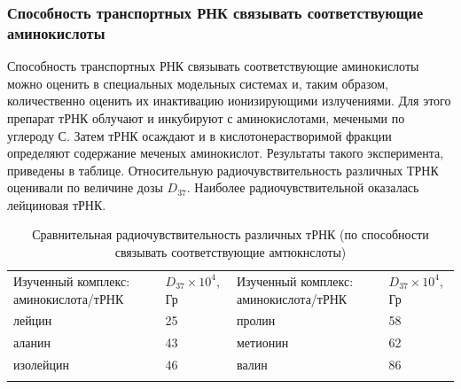 \documentclass[a4paper, 14pt]{article}
\begin{document}
\subsubsection{Способность транспортных РНК связывать соответствующие
аминокислоты}
Способность транспортных РНК связывать соответствующие аминокислоты
можно оценить в специальных модельных системах и, таким образом, количественно
оценить их инактивацию ионизирующими излучениями. Для этого препарат тРНК
облучают и инкубируют с аминокислотами, мечеными по углероду С. Затем тРНК
осаждают и в кислотонерастворимой фракции определяют содержание меченых
аминокислот. Результаты такого эксперимента, приведены в таблице. Относительную
радиочувствительность различных ТРНК оценивали по величине дозы $D_{37}$. Наиболее
радиочувствительной оказалась лейциновая тРНК.
\begin{table}[htbp]
    \centering\begin{tabular}{*{2}{|C{5.6cm}|C{1.6cm}|}}
        \hhline{|-|-||-|-|}
        Изученный комплекс: аминокислота/тРНК & $D_{37} \times 10^4$, Гр & Изученный комплекс: аминокислота/тРНК & $D_{37} \times 10^4$, Гр \\ \hhline{|-|-||-|-|}
        лейцин & 25 & пролин & 58 \\ \hhline{|-|-||-|-|}
        аланин & 43 & метионин & 62 \\ \hhline{|-|-||-|-|}
        изолейцин & 46 & валин & 86 \\ \hhline{|-|-||-|-|}
    \end{tabular}
    \caption{Сравнительная радиочувствительность различных тРНК (по способности связывать соответствующие амтюкнслоты)}
    \label{radioSensibilityOftDNA}
\end{table}
\end{document}
